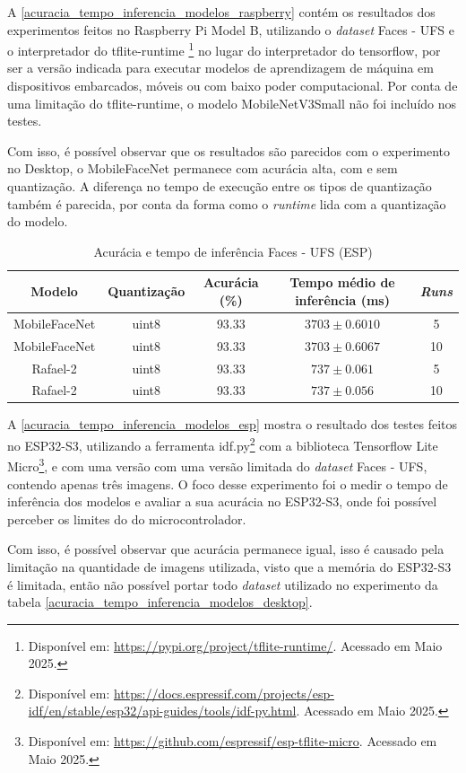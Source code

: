 A \autoref{acuracia_tempo_inferencia_modelos_raspberry} contém os resultados dos experimentos feitos no
Raspberry Pi Model B, utilizando o \textit{dataset} Faces - UFS e o interpretador do tflite-runtime
\footnote{Disponível em: \url{https://pypi.org/project/tflite-runtime/}. Acessado em Maio 2025.}
no lugar do interpretador do tensorflow, por ser a versão indicada para executar modelos de aprendizagem de
máquina em dispositivos embarcados, móveis ou com baixo poder computacional. Por conta de uma limitação
do tflite-runtime, o modelo MobileNetV3Small não foi incluído nos testes.

Com isso, é possível observar que os resultados são parecidos com o experimento no Desktop, o MobileFaceNet
permanece com acurácia alta, com e sem quantização. A diferença no tempo de execução entre os tipos de
quantização também é parecida, por conta da forma como o \textit{runtime} lida com a quantização do modelo.

\begin{table}[htb]
\centering
\ABNTEXfontereduzida
\caption[Acurácia e tempo de inferência (ESP)]{Acurácia e tempo de inferência Faces - UFS (ESP)}
\label{acuracia_tempo_inferencia_modelos_esp}
\begin{tabular}{ |c|c|c|c|c| }
	\hline
	\textbf{Modelo} & \textbf{Quantização} & \textbf{Acurácia (\%)} & \textbf{Tempo médio de inferência (ms)} & \textbf{\textit{Runs}} \\
	\hline
	MobileFaceNet 	&uint8	& 	93.33& $3703 \pm 0.6010$ & 5 \\
	MobileFaceNet 	&uint8	& 	93.33& $3703 \pm 0.6067$ & 10 \\
	Rafael-2	&uint8	& 	93.33& $737 \pm 0.061$ & 5\\
	Rafael-2	&uint8	& 	93.33& $737 \pm 0.056$ & 10\\
	\hline
\end{tabular}
\end{table}

A \autoref{acuracia_tempo_inferencia_modelos_esp} mostra o resultado dos testes feitos no ESP32-S3,
utilizando a ferramenta idf.py\footnote{Disponível em:
\url{https://docs.espressif.com/projects/esp-idf/en/stable/esp32/api-guides/tools/idf-py.html}.
Acessado em Maio 2025.}
com a biblioteca Tensorflow Lite Micro\footnote{Disponível em: \url{
https://github.com/espressif/esp-tflite-micro}. Acessado em Maio 2025.},
e com uma versão com uma versão limitada do \textit{dataset} Faces - UFS, contendo apenas três imagens.
O foco desse experimento foi o medir o tempo de inferência dos modelos e avaliar a sua acurácia
no ESP32-S3, onde foi possível perceber os limites do do microcontrolador.

Com isso, é possível observar que acurácia permanece igual, isso é causado pela limitação na
quantidade de imagens utilizada, visto que a memória do ESP32-S3 é limitada, então não possível
portar todo \textit{dataset} utilizado no experimento da tabela
\autoref{acuracia_tempo_inferencia_modelos_desktop}.


